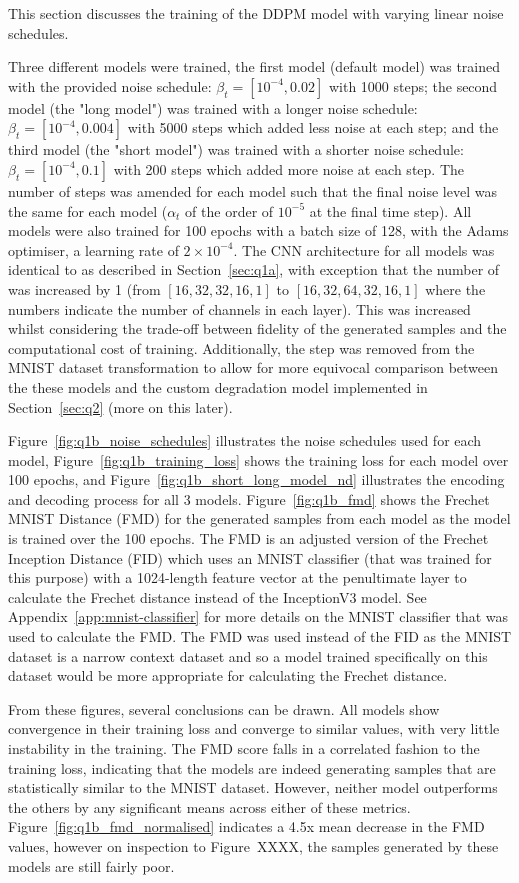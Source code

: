 This section discusses the training of the DDPM model with varying linear noise schedules.

Three different models were trained, the first model (default model) was trained with the provided noise schedule:
$\beta_{t} = [10^{-4}, 0.02]$ with 1000 steps; the second model (the "long model") was trained with a longer noise schedule:
$\beta_{t} = [10^{-4}, 0.004]$ with 5000 steps which added less noise at each step; and the third model (the "short model")
was trained with a shorter noise schedule: $\beta_{t} = [10^{-4}, 0.1]$ with 200 steps which added more noise at each step.
The number of steps was amended for each model such that the final noise level was the same for each model ($\alpha_{t}$
of the order of $10^{-5}$ at the final time step).
All models were also trained for 100 epochs with a batch size of 128, with the Adams optimiser, a learning rate of
$2 \times 10^{-4}$.
The CNN architecture for all models was identical to as described in Section~\eqref{sec:q1a}, with exception
that the number of  was increased by 1 (from $[16, 32, 32, 16, 1]$ to $[16, 32, 64, 32, 16, 1]$ where
the numbers indicate the number of channels in each layer).
This was increased whilst considering the trade-off between fidelity of the generated samples and the computational cost of training.
Additionally, the  step was removed from the MNIST dataset transformation
to allow for more equivocal comparison between the these models and the custom degradation model implemented in Section~\eqref{sec:q2}
(more on this later).

Figure~\eqref{fig:q1b_noise_schedules} illustrates the noise schedules used for each model, Figure~\eqref{fig:q1b_training_loss}
shows the training loss for each model over 100 epochs, and Figure~\eqref{fig:q1b_short_long_model_nd} illustrates the encoding
and decoding process for all 3 models.
Figure~\eqref{fig:q1b_fmd} shows the Frechet MNIST Distance (FMD) for the generated samples from each model as the model
is trained over the 100 epochs.
The FMD is an adjusted version of the Frechet Inception Distance (FID) which uses an MNIST classifier (that was trained
for this purpose) with a 1024-length feature vector at the penultimate layer to calculate the Frechet distance instead
of the InceptionV3 model.
See Appendix~\eqref{app:mnist-classifier} for more details on the MNIST classifier that was used to calculate the FMD.
The FMD was used instead of the FID as the MNIST dataset is a narrow context dataset and so a model trained specifically on this
dataset would be more appropriate for calculating the Frechet distance.

From these figures, several conclusions can be drawn.
All models show convergence in their training loss and converge to similar values, with very little instability in the training.
The FMD score falls in a correlated fashion to the training loss, indicating that the models are indeed generating samples
that are statistically similar to the MNIST dataset.
However, neither model outperforms the others by any significant means across either of these metrics.
Figure~\eqref{fig:q1b_fmd_normalised} indicates a 4.5x mean decrease in the FMD values, however on inspection to
Figure~XXXX, the samples generated by these models are still fairly poor.
